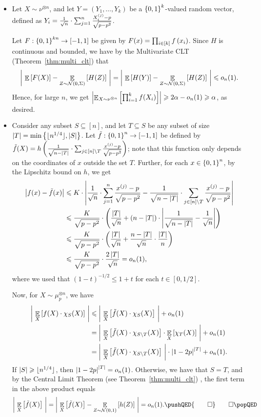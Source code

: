 \begin{itemize}
	\item Let $X \sim \nu^{\otimes n}$, and let $Y = (Y_1,\dots, Y_k)$ be a $\left\{ 0,1 \right\}^k$-valued random vector, defined as $Y_i=\frac{1}{\sqrt{n}}\cdot \sum_{j=1}^n \frac{X_i^{\left( j \right)}-p}{\sqrt{p-p^2}}$.
	 
	Let $F:\left\{ 0,1 \right\}^{kn}\to [-1,1]$ be given by $F(x) = \prod_{i\in [k]}f\left( x_i \right)$.
	Since $H$ is continuous and bounded, we have by the Multivariate CLT (Theorem~\ref{thm:multi_clt}) that
	\[ \left|\ \mathop{\mathbb{E}}\left[ F(X) \right] - \mathop{\mathbb{E}}_{Z \sim \mathcal N(0, \Sigma)} \left[ H(Z) \right]\ \right| = \left|\ \mathop{\mathbb{E}}\left[ {H(Y)} \right] - \mathop{\mathbb{E}}_{Z \sim \mathcal N(0, \Sigma)} \left[ H(Z) \right]\ \right| \leqslant o_n(1).\]
	Hence, for large $n$, we get $\left|\mathop{\mathbb{E}}_{X\sim \nu^{\otimes n}} \left[ \prod_{i=1}^k f(X_i) \right] \right|\geqslant 2\alpha-o_n(1)\geqslant \alpha$, as desired.
	
	
	\item Consider any subset $S\subseteq [n]$, and let $T\subseteq S$ be any subset of size $\left|T\right|=\min\left\{ \lfloor n^{1/4}\rfloor, \left|S\right| \right\}$. Let $\tilde{f}:\left\{ 0,1 \right\}^n\to [-1,1]$ be defined by $\tilde{f}(X) = h\left( \frac{1}{\sqrt{n-\left|T\right|}}\cdot \sum_{j\in [n]\setminus T} \frac{x^{\left( j \right)}-p}{\sqrt{p-p^2}}  \right)$; note that this function only depends on the coordinates of $x$ outside the set $T$. Further, for each $x\in \left\{ 0,1 \right\}^n$, by the Lipschitz bound on $h$, we get
	\begin{align*}
		\left|f(x)-\tilde{f}(x)\right| &\leqslant K\cdot  \left|\frac{1}{\sqrt{n}}\cdot \sum_{j=1}^n \frac{x^{\left( j \right)}-p}{\sqrt{p-p^2}} - \frac{1}{\sqrt{n-\left|T\right|}}\cdot \sum_{j\in [n]\setminus T} \frac{x^{\left( j \right)}-p}{\sqrt{p-p^2}}\right|
		\\&\leqslant \frac{K}{\sqrt{p-p^2}}\cdot\left( \frac{\left|T\right|}{\sqrt{n}}+ \left( n-\left|T\right| \right)\cdot \left|\frac{1}{\sqrt{n-\left|T\right|}} - \frac{1}{\sqrt{n}}\right| \right)
		\\&\leqslant \frac{K}{\sqrt{p-p^2}}\cdot\left( \frac{\left|T\right|}{\sqrt{n}}+ \frac{n-\left|T\right|}{\sqrt{n}}\cdot \frac{\left|T\right|}{n} \right)
		\\&\leqslant \frac{K}{\sqrt{p-p^2}}\cdot\frac{2\left|T\right|}{\sqrt{n}} = o_n(1),
	\end{align*}
	where we used that $(1-t)^{-1/2} \leq 1+t$ for each $t\in [0,1/2]$.
 
	Now, for $X\sim \mu_p^{\otimes n}$, we have
	\begin{align*}
		\abs{\ \E_X\sqbrac{f(X)\cdot \chi_S(X)}\ } &\leq \abs{\ \E_X\sqbrac{\tilde{f}(X)\cdot \chi_S(X)}\ } + o_n(1)
		\\&= \abs{\ \E_X\sqbrac{\tilde{f}(X)\cdot \chi_{S\setminus T}(X)}\cdot \E_X\sqbrac{ \chi_{T}(X)}\ } + o_n(1)
		\\&= \abs{\ \E_X\sqbrac{\tilde{f}(X)\cdot \chi_{S\setminus T}(X)}\ }\cdot \abs{1-2p}^{\abs{T}} + o_n(1).
	\end{align*}
	If $\left|S\right| \geqslant \lfloor n^{1/4} \rfloor$, then $\left|1-2p\right|^{\left|T\right|} = o_n(1)$.
	Otherwise, we have that $S=T$, and by the Central Limit Theorem (see Theorem~\ref{thm:multi_clt}) , the first term in the above product equals
	\[ \abs{\ \E_X\sqbrac{\tilde{f}(X)}\ } = \abs{\ \E_X\sqbrac{\tilde{f}(X)} - \E_{Z\sim \mc N(0,1)}\sqbrac{h(Z)}\ } = o_n(1). \pushQED{\qed}\qedhere\popQED \]	
\end{itemize}

